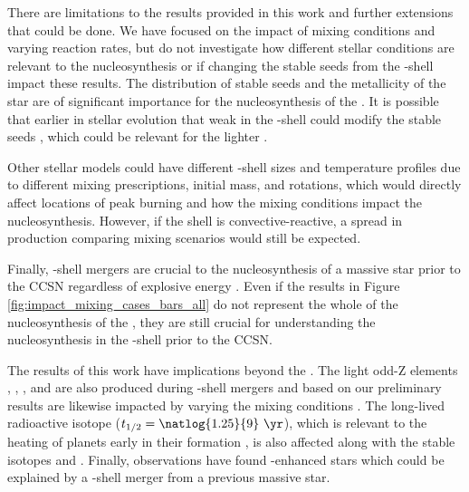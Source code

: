 There are limitations to the results provided in this work and further extensions that could be done.
We have focused on the impact of mixing conditions and varying reaction rates, but do not investigate how different stellar conditions are relevant to the nucleosynthesis or if changing the stable seeds from the \carbon[]-shell impact these results.
The distribution of stable seeds and the metallicity of the star are of significant importance for the nucleosynthesis of the \pnucn{} \citep{travaglioTestingRoleSNe2015, battinoHeavyElementsNucleosynthesis2020}.
It is possible that earlier in stellar evolution that weak \sprn{} in the \carbon[]-shell could modify the stable seeds \citep{pignatariWEAKSPROCESSMASSIVE2010}, which could be relevant for the lighter \pnucn.

Other stellar models could have different \oxygen[]-shell sizes and temperature profiles due to different mixing prescriptions, initial mass, and rotations, which would directly affect locations of peak burning and how the mixing conditions impact the nucleosynthesis.
However, if the shell is convective-reactive, a spread in production comparing mixing scenarios would still be expected.

Finally, \oxygen[]-\carbon[] shell mergers are crucial to the nucleosynthesis of a massive star prior to the CCSN regardless of explosive energy \citep{ robertiGprocessNucleosynthesisCorecollapse2024b}.
Even if the results in Figure \ref{fig:impact_mixing_cases_bars_all} do not represent the whole of the nucleosynthesis of the \pnucn{}, they are still crucial for understanding the nucleosynthesis in the \oxygen[]-shell prior to the CCSN.

The results of this work have implications beyond the \pnucn.
The light odd-Z elements \phosphorus[], \chlorine[], \potassium[], and \scandium[] are also produced during \oxygen[]-\carbon[] shell mergers and based on our preliminary results are likewise impacted by varying the mixing conditions \citep{ritterConvectivereactiveNucleosynthesisSc2018, robertiOccurrenceImpactCarbonOxygen2025}.
The long-lived radioactive isotope \potassium[40] ($t_{1/2} = \natlog{1.25}{9}~\yr$), which is relevant to the heating of planets early in their formation \citep{frankRadiogenicHeatingEvolution2014, oneillEffectGalacticChemical2020}, is also affected along with the stable \potassium[] isotopes \potassium[39] and \potassium[41]. 
Finally, observations have found \phosphorus[]-enhanced stars \citep{masseronPhosphorusrichStarsUnusual2020, braunerUnveilingChemicalFingerprint2023, braunerUnveilingChemicalFingerprint2024} which could be explained by a \oxygen[]-\carbon[] shell merger from a previous massive star.

